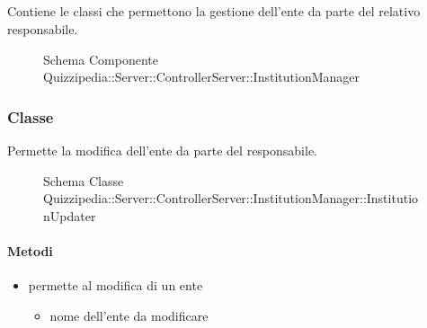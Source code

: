 \subsection{}
Contiene le classi che permettono la gestione dell'ente da parte del relativo responsabile.
\begin{figure}[H]
\centering
\noindent{}
\caption[Schema Componente Quizzipedia::Server::ControllerServer::InstitutionManager]{Schema Componente Quizzipedia::Server::ControllerServer::InstitutionManager}
\end{figure}
\subsubsection{Classe }
Permette la modifica dell'ente da parte del responsabile.
\begin{figure}[H]
\centering
\noindent{}
\caption[Schema Classe InstitutionUpdater]{Schema Classe Quizzipedia::Server::ControllerServer::InstitutionManager::InstitutionUpdater}
\end{figure}
\paragraph{Metodi}
\begin{itemize}
\item {}
\newline
permette al modifica di un ente
\newline
{}
\newline
\begin{itemize}
\item {}
\newline
nome dell'ente da modificare
\end{itemize}
\end{itemize}
